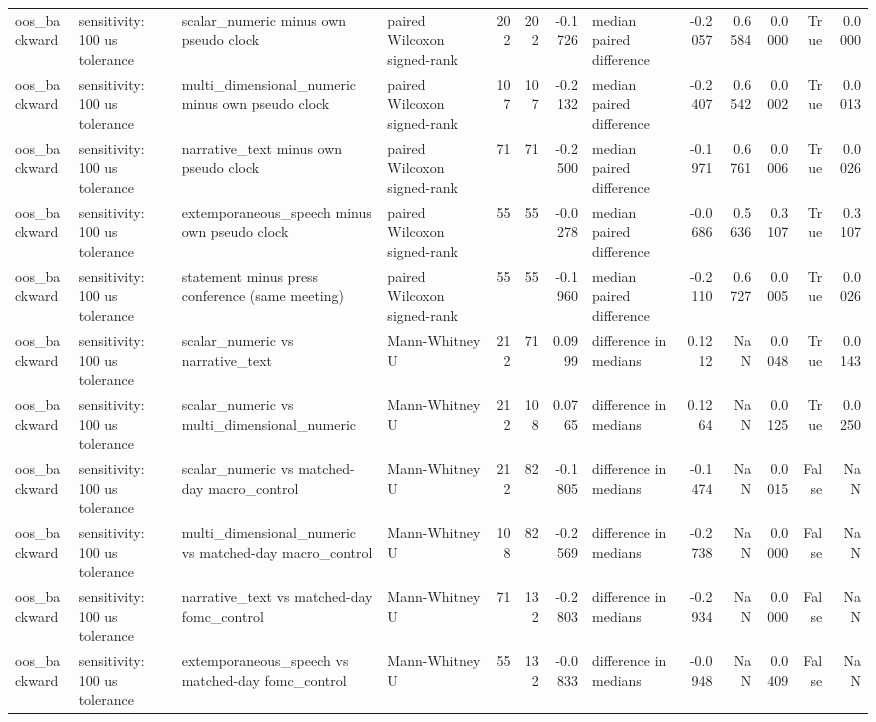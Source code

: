\begin{tabular}{llllrrrlrrrrr}
oos_backward & sensitivity: 100 us tolerance & scalar_numeric minus own pseudo clock & paired Wilcoxon signed-rank & 202 & 202 & -0.1726 & median paired difference & -0.2057 & 0.6584 & 0.0000 & True & 0.0000 \\
oos_backward & sensitivity: 100 us tolerance & multi_dimensional_numeric minus own pseudo clock & paired Wilcoxon signed-rank & 107 & 107 & -0.2132 & median paired difference & -0.2407 & 0.6542 & 0.0002 & True & 0.0013 \\
oos_backward & sensitivity: 100 us tolerance & narrative_text minus own pseudo clock & paired Wilcoxon signed-rank & 71 & 71 & -0.2500 & median paired difference & -0.1971 & 0.6761 & 0.0006 & True & 0.0026 \\
oos_backward & sensitivity: 100 us tolerance & extemporaneous_speech minus own pseudo clock & paired Wilcoxon signed-rank & 55 & 55 & -0.0278 & median paired difference & -0.0686 & 0.5636 & 0.3107 & True & 0.3107 \\
oos_backward & sensitivity: 100 us tolerance & statement minus press conference (same meeting) & paired Wilcoxon signed-rank & 55 & 55 & -0.1960 & median paired difference & -0.2110 & 0.6727 & 0.0005 & True & 0.0026 \\
oos_backward & sensitivity: 100 us tolerance & scalar_numeric vs narrative_text & Mann-Whitney U & 212 & 71 & 0.0999 & difference in medians & 0.1212 & NaN & 0.0048 & True & 0.0143 \\
oos_backward & sensitivity: 100 us tolerance & scalar_numeric vs multi_dimensional_numeric & Mann-Whitney U & 212 & 108 & 0.0765 & difference in medians & 0.1264 & NaN & 0.0125 & True & 0.0250 \\
oos_backward & sensitivity: 100 us tolerance & scalar_numeric vs matched-day macro_control & Mann-Whitney U & 212 & 82 & -0.1805 & difference in medians & -0.1474 & NaN & 0.0015 & False & NaN \\
oos_backward & sensitivity: 100 us tolerance & multi_dimensional_numeric vs matched-day macro_control & Mann-Whitney U & 108 & 82 & -0.2569 & difference in medians & -0.2738 & NaN & 0.0000 & False & NaN \\
oos_backward & sensitivity: 100 us tolerance & narrative_text vs matched-day fomc_control & Mann-Whitney U & 71 & 132 & -0.2803 & difference in medians & -0.2934 & NaN & 0.0000 & False & NaN \\
oos_backward & sensitivity: 100 us tolerance & extemporaneous_speech vs matched-day fomc_control & Mann-Whitney U & 55 & 132 & -0.0833 & difference in medians & -0.0948 & NaN & 0.0409 & False & NaN \\

\end{tabular}

